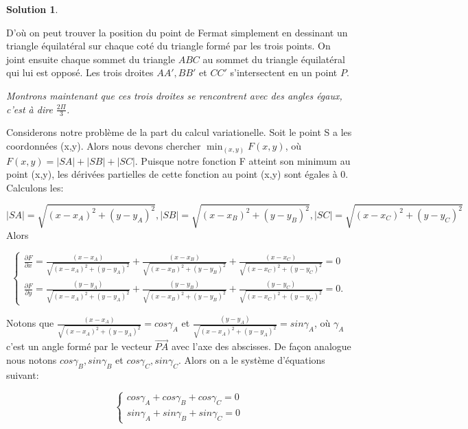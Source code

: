 \documentclass[10pt,a4paper]{article}%
\theoremstyle{theorem}
\theoremstyle{definition}
\newtheorem*{solution*}{Solution}
\begin{document}
\begin{solution*}
\begin{center}
\begin{tikzpicture}
        		\end{tikzpicture}
	        \end{center}
       		D'où on peut trouver la position du point de Fermat simplement en dessinant un triangle équilatéral sur chaque coté du triangle formé par les trois points. On joint ensuite chaque sommet du triangle $ABC$ au sommet du triangle équilatéral qui lui est opposé. Les trois droites $AA',BB'$ et $CC'$ s'intersectent en un point $P$.
        
       		\textit{Montrons maintenant que ces trois droites se rencontrent avec des angles égaux, c'est à dire $\frac{2\Pi}{3}$. }
        
        	Considerons notre problème de la part du calcul variationelle. Soit le point S a les coordonnées (x,y). Alors nous devons chercher $\min_{(x,y)} F(x,y)$, où $F(x,y)=|SA|+|SB|+|SC|$. Puisque notre fonction F atteint son minimum au point (x,y), les dérivées partielles de cette fonction au point (x,y) sont égales à 0. Calculons les:
        
        	\[|SA|=\sqrt{(x-x_A)^2+(y-y_A)^2}, |SB|=\sqrt{(x-x_B)^2+(y-y_B)^2}, |SC|=\sqrt{(x-x_C)^2+(y-y_C)^2}\]
        	Alors
        
        	\begin{equation*}
        		\begin{cases}
		        \frac{\partial F}{\partial x}=\frac{(x-x_A)}{\sqrt{(x-x_A)^2+(y-y_A)^2}}+\frac{(x-x_B)}{\sqrt{(x-x_B)^2+(y-y_B)^2}}+\frac{(x-x_C)}{\sqrt{(x-x_C)^2+(y-y_C)^2}}=0
        		\\
		        \frac{\partial F}{\partial y}=\frac{(y-y_A)}{\sqrt{(x-x_A)^2+(y-y_A)^2}}+\frac{(y-y_B)}{\sqrt{(x-x_B)^2+(y-y_B)^2}}+\frac{(y-y_C)}{\sqrt{(x-x_C)^2+(y-y_C)^2}}=0.
        		\end{cases}
        	\end{equation*}
        
	        Notons que $\frac{(x-x_A)}{\sqrt{(x-x_A)^2+(y-y_A)^2}}=cos\gamma_A$ et $\frac{(y-y_A)}{\sqrt{(x-x_A)^2+(y-y_A)^2}}=sin \gamma_A$, 
	        où $\gamma_A$ c'est un angle formé par le vecteur $\overrightarrow{PA}$ avec l'axe des abscisses. De façon analogue nous notons $cos\gamma_B, sin\gamma_B$ et $cos\gamma_C, sin\gamma_C$.
	        Alors on a le système d'équations suivant:
	        
	        \begin{equation*}
		        \begin{cases}
		        	cos\gamma_A+cos\gamma_B+cos\gamma_C=0
		        	\\
		        	sin\gamma_A+sin\gamma_B+sin\gamma_C=0
		        \end{cases}
	        \end{equation*}
	        

\end{solution*}
\end{document}
